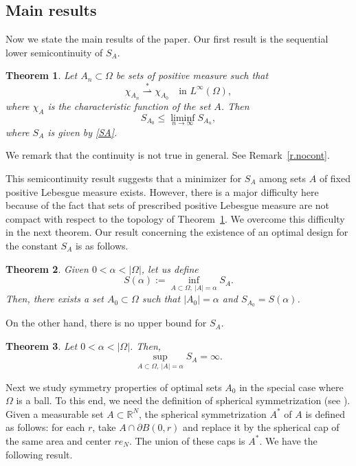 \documentclass[11pt]{amsart}
\newtheorem{theorem}{Theorem}[section]
\theoremstyle{remark}
\numberwithin{equation}{section}
\newcommand{\R}{\mathbb{R}}
\begin{document}
\subsection{Main results}
Now we state the main results of the paper. Our first result is the sequential lower semicontinuity of $S_A$.

\begin{theorem}\label{t.semi}
Let $A_n\subset\Omega$ be sets of positive measure such that
\[
\chi_{A_n}\overset{*}{\rightharpoonup}\chi_{A_0}\quad\text{in } L^\infty(\Omega),
\]
where $\chi_A$ is the characteristic function of the set $A$. Then
\[
S_{A_0}\le\liminf_{n\to\infty}S_{A_n},
\]
where $S_A$ is given by \eqref{SA}.
\end{theorem}

We remark that the continuity is not true in general. See Remark~\ref{r.nocont}.

This semicontinuity result suggests that a minimizer for $S_A$ among sets $A$ of fixed positive Lebesgue measure exists. However, there is a major difficulty here because of the fact that sets of prescribed positive Lebesgue measure are not compact with respect to the topology of Theorem~\ref{t.semi}. We overcome this difficulty in the next theorem. Our result concerning the existence of an optimal design for the constant $S_A$ is as follows.

\begin{theorem}\label{t.exist}
Given $0<\alpha<|\Omega|$, let us define
\begin{equation}\label{Salpha}
S(\alpha):=\inf_{A\subset\Omega,\ |A|=\alpha}S_A.
\end{equation}
Then, there exists a set $A_0\subset\Omega$ such that $|A_0|=\alpha$ and $S_{A_0}=S(\alpha)$.
\end{theorem}

On the other hand, there is no upper bound for $S_A$.

\begin{theorem}\label{t.sup}
Let $0<\alpha<|\Omega|$. Then,
\[
\sup_{A\subset\Omega,\ |A|=\alpha}S_A=\infty.
\]
\end{theorem}

Next we study symmetry properties of optimal sets $A_0$ in the special case where $\Omega$ is a ball. To this end, we need the definition of spherical symmetrization (see \cite{Sp}). Given a measurable set $A\subset\R^N$, the spherical symmetrization $A^*$ of $A$ is defined as follows: for each $r$, take $A\cap\partial B(0,r)$ and replace it by the spherical cap of the same area and center $re_N$. The union of these caps is $A^*$. We have the following result.
\end{document}
